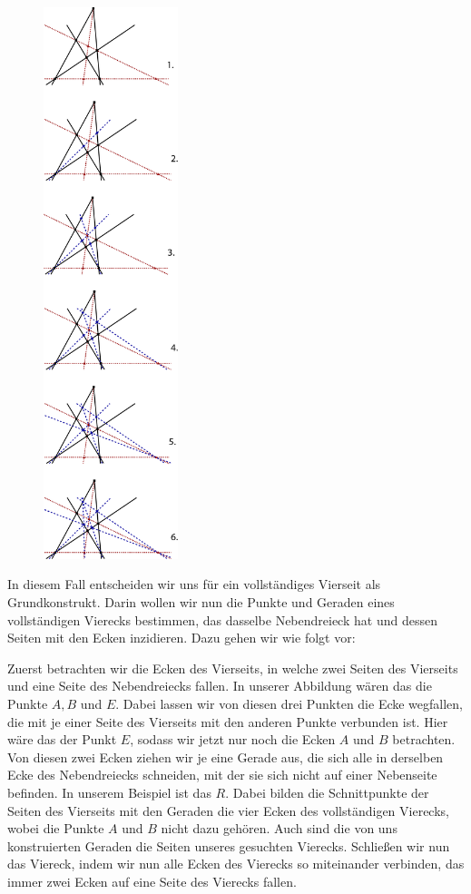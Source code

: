 \documentclass[12pt,a4paper]{article}
\begin{document}
\begin{figure}
\centering
\includegraphics[width=0.35\textwidth]{Bilder/13erKonfigStepbyStep3.png}
\end{figure}

In diesem Fall entscheiden wir uns für ein vollständiges Vierseit als Grundkonstrukt. Darin wollen wir nun die Punkte und Geraden eines vollständigen Vierecks bestimmen, das dasselbe Nebendreieck hat und dessen Seiten mit den Ecken inzidieren. Dazu gehen wir wie folgt vor:

Zuerst betrachten wir die Ecken des Vierseits, in welche zwei Seiten des Vierseits und eine Seite des Nebendreiecks fallen. In unserer Abbildung wären das die Punkte $A, B$ und $E$. Dabei lassen wir von diesen drei Punkten die Ecke wegfallen, die mit je einer Seite des Vierseits mit den anderen Punkte verbunden ist. Hier wäre das der Punkt $E$, sodass wir jetzt nur noch die Ecken $A$ und $B$ betrachten. Von diesen zwei Ecken ziehen wir je eine Gerade aus, die sich alle in derselben Ecke des Nebendreiecks schneiden, mit der sie sich nicht auf einer Nebenseite befinden. In unserem Beispiel ist das $R$. Dabei bilden die Schnittpunkte der Seiten des Vierseits mit den Geraden die vier Ecken des vollständigen Vierecks, wobei die Punkte $A$ und $B$ nicht dazu gehören. Auch sind die von uns konstruierten Geraden die Seiten unseres gesuchten Vierecks. Schließen wir nun das Viereck, indem wir nun alle Ecken des Vierecks so miteinander verbinden, das immer zwei Ecken auf eine Seite des Vierecks fallen.
\end{document}
